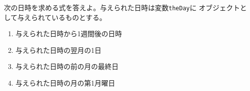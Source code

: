 \begin{Prob}\upshape\label{DateProb}\Must
 次の日時を求める式を答えよ。与えられた日時は変数\texttt{theDay}に
 オブジェクトとして与えられているものとする。
 \begin{enumerate}
	\item 与えられた日時から1週間後の日時
	\item 与えられた日時の翌月の1日
	\item 与えられた日時の前の月の最終日
	\item 与えられた日時の月の第1月曜日
 \end{enumerate}
\end{Prob}


